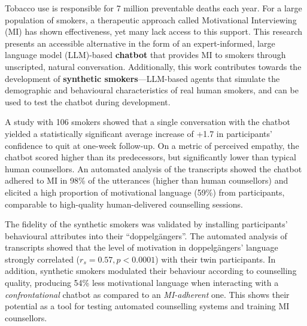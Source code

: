 Tobacco use is responsible for 7 million preventable deaths each year. For a large population of smokers, a therapeutic approach called Motivational Interviewing (MI) has shown effectiveness, yet many lack access to this support. This research presents an accessible alternative in the form of an expert-informed, large language model (LLM)-based \textbf{chatbot} that provides MI to smokers through unscripted, natural conversation. Additionally, this work contributes towards the development of \textbf{synthetic smokers}---LLM-based agents that simulate the demographic and behavioural characteristics of real human smokers, and can be used to test the chatbot during development.

A study with 106 smokers showed that a single conversation with the chatbot yielded a statistically significant average increase of +1.7 in participants' confidence to quit at one-week follow-up. On a metric of perceived empathy, the chatbot scored higher than its predecessors, but significantly lower than typical human counsellors. An automated analysis of the transcripts showed the chatbot adhered to MI in 98\% of the utterances (higher than human counsellors) and elicited a high proportion of motivational language (59\%) from participants, comparable to high-quality human-delivered counselling sessions.

The fidelity of the synthetic smokers was validated by installing participants' behavioural attributes into their ``doppelgängers''. The automated analysis of transcripts showed that the level of motivation in doppelgängers' language strongly correlated ($r_{s}=0.57, p<0.0001$) with their twin participants. In addition, synthetic smokers modulated their behaviour according to counselling quality, producing 54\% less motivational language when interacting with a \emph{confrontational} chatbot as compared to an \emph{MI-adherent} one. This shows their potential as a tool for testing automated counselling systems and training MI counsellors.
